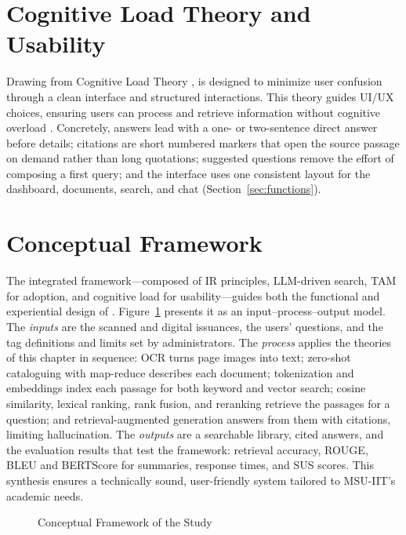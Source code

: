 \section{Cognitive Load Theory and Usability}\label{sec:cognitive-load}

Drawing from Cognitive Load Theory \citep{sweller1988}, \cs{} is designed to minimize user confusion through a clean interface and structured interactions. This theory guides UI/UX choices, ensuring users can process and retrieve information without cognitive overload \citep{paas1994}. Concretely, answers lead with a one- or two-sentence direct answer before details; citations are short numbered markers that open the source passage on demand rather than long quotations; suggested questions remove the effort of composing a first query; and the interface uses one consistent layout for the dashboard, documents, search, and chat (Section~\ref{sec:functions}).

\section{Conceptual Framework}\label{sec:conceptual}

The integrated framework---composed of IR principles, LLM-driven search, TAM for adoption, and cognitive load for usability---guides both the functional and experiential design of \cs{}. Figure~\ref{fig:conceptual} presents it as an input--process--output model. The \emph{inputs} are the scanned and digital issuances, the users' questions, and the tag definitions and limits set by administrators. The \emph{process} applies the theories of this chapter in sequence: OCR turns page images into text; zero-shot cataloguing with map-reduce describes each document; tokenization and embeddings index each passage for both keyword and vector search; cosine similarity, lexical ranking, rank fusion, and reranking retrieve the passages for a question; and retrieval-augmented generation answers from them with citations, limiting hallucination. The \emph{outputs} are a searchable library, cited answers, and the evaluation results that test the framework: retrieval accuracy, ROUGE, BLEU and BERTScore for summaries, response times, and SUS scores. This synthesis ensures a technically sound, user-friendly system tailored to MSU-IIT's academic needs.

\begin{figure}[htbp]
  \centering
  
  \caption{Conceptual Framework of the Study}\label{fig:conceptual}
\end{figure}
